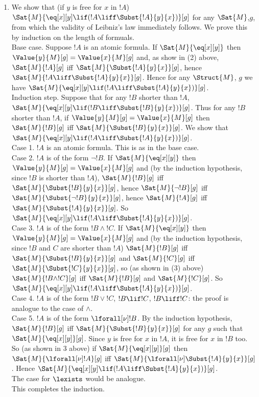\documentclass[../../../../include/open-logic-section]{subfiles}
\begin{document}
\begin{ans}
\begin{enumerate}
	\item We show that (if $y$ is free for $x$ in $!A$) $\Sat{M}{\eq[x][y] \lif (!A \liff \Subst{!A}{y}{x})}[g]$ for any $\Sat{M}$,$g$, from which the validity of Leibniz's law immediately follows. We prove this by induction on the length of formuals.\\
	Base case. Suppose $!A$ is an atomic formula. If $\Sat{M}{\eq[x][y]}$ then $\Value{y}{M}[g] = \Value{x}{M}[g]$ and, as show in (2) above, $\Sat{M}{!A}[g]$ iff $\Sat{M}{\Subst{!A}{y}{x}}[g]$, hence $\Sat{M}{!A \liff \Subst{!A}{y}{x}}[g]$. Hence for any $\Struct{M}$, $g$ we have $\Sat{M}{\eq[x][y] \lif (!A \liff \Subst{!A}{y}{x})}[g]$.\\
	Induction step. Suppose that for any $!B$ shorter than $!A$, $\Sat{M}{\eq[x][y] \lif (!B \liff \Subst{!B}{y}{x})}[g]$. Thus for any $!B$ shorter than $!A$, if $\Value{y}{M}[g] = \Value{x}{M}[g]$ then $\Sat{M}{!B}[g]$ iff $\Sat{M}{\Subst{!B}{y}{x}}[g]$. We show that $\Sat{M}{\eq[x][y] \lif (!A \liff \Subst{!A}{y}{x})}[g]$.\\
	Case 1. $!A$ is an atomic formula. This is as in the base case.\\
	Case 2. $!A$ is of the form $\lnot !B$. If $\Sat{M}{\eq[x][y]}$ then $\Value{y}{M}[g] = \Value{x}{M}[g]$ and (by the induction hypothesis, since $!B$ is shorter than $!A$), $\Sat{M}{!B}[g]$ iff $\Sat{M}{\Subst{!B}{y}{x}}[g]$, hence $\Sat{M}{\lnot !B}[g]$ iff $\Sat{M}{\Subst{\lnot !B}{y}{x}}[g]$, hence $\Sat{M}{!A}[g]$ iff $\Sat{M}{\Subst{!A}{y}{x}}[g]$. So $\Sat{M}{\eq[x][y] \lif (!A \liff \Subst{!A}{y}{x})}[g]$.\\
	Case 3. $!A$ is of the form $!B \land !C$. If $\Sat{M}{\eq[x][y]}$ then $\Value{y}{M}[g] = \Value{x}{M}[g]$ and (by the induction hypothesis, since $!B$ and $C$ are shorter than $!A$)  $\Sat{M}{!B}[g]$ iff $\Sat{M}{\Subst{!B}{y}{x}}[g]$ and $\Sat{M}{!C}[g]$ iff $\Sat{M}{\Subst{!C}{y}{x}}[g]$, so (as shown in (3) above) $\Sat{M}{!B \land !C}[g]$ iff $\Sat{M}{!B}[g]$ and $\Sat{M}{!C}[g]$. So $\Sat{M}{\eq[x][y] \lif (!A \liff \Subst{!A}{y}{x})}[g]$.\\
	Case 4. $!A$ is of the form $!B \lor !C$, $!B \lif !C$, $!B \liff !C$: the proof is analogue to the case of $\land$.\\
	Case 5. $!A$ is of the form $\lforall[\nu]!B$. By the induction hypothesis, $\Sat{M}{!B}[g]$ iff $\Sat{M}{\Subst{!B}{y}{x}}[g]$ for any $g$ such that $\Sat{M}{\eq[x][y]}[g]$. Since
	$y$ is free for $x$ in $!A$, it is free for $x$ in $!B$ too. So (as shown in 3 above) if $\Sat{M}{\eq[x][y]}[g]$ then $\Sat{M}{\lforall[\nu]!A}[g]$ iff $\Sat{M}{\lforall[\nu]\Subst{!A}{y}{x}}[g]$. Hence $\Sat{M}{\eq[x][y] \lif (!A \liff \Subst{!A}{y}{x})}[g]$.\\
	The case for $\lexists$ would be analogue.\\
	This completes the induction.
\end{enumerate}
\end{ans}
\end{document}
